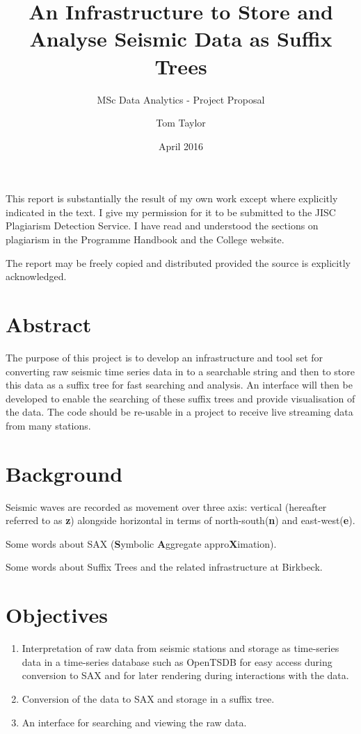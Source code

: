 \documentclass[11pt]{scrartcl}
\title{An Infrastructure to Store and Analyse Seismic Data as Suffix Trees}
\subtitle{MSc Data Analytics - Project Proposal}
\date{April 2016}
\author{Tom Taylor}
\begin{document}
\maketitle
\begin{itshape}
	\noindent This report is substantially the result of my own work except where explicitly
	indicated in the text. I give my permission for it to be submitted to the JISC
	Plagiarism Detection Service. I have read and understood the sections on plagiarism
	in the Programme Handbook and the College website.
	
	\noindent The report may be freely copied and distributed provided the source is explicitly
	acknowledged.
\end{itshape}

\tableofcontents

\newpage

\section{Abstract}
	The purpose of this project is to develop an infrastructure and tool set for converting raw seismic time series data in to a searchable string and then to store this data as a suffix tree for fast searching and analysis.  An interface will then be developed to enable the searching of these suffix trees and provide visualisation of the data.  The code should be re-usable in a project to receive live streaming data from many stations.
	
\section{Background}
	Seismic waves are recorded as movement over three axis: vertical (hereafter referred to as \textbf{z}) alongside horizontal in terms of north-south(\textbf{n}) and east-west(\textbf{e}).
	
	Some words about SAX (\textbf{S}ymbolic \textbf{A}ggregate appro\textbf{X}imation).
	
	Some words about Suffix Trees and the related infrastructure at Birkbeck.

\section{Objectives}
\begin{enumerate}
	\item Interpretation of raw data from seismic stations and storage as time-series data in a time-series database such as OpenTSDB for easy access during conversion to SAX and for later rendering during interactions with the data.
	\item Conversion of the data to SAX and storage in a suffix tree.
	\item An interface for searching and viewing the raw data.
\end{enumerate}
\end{document}
